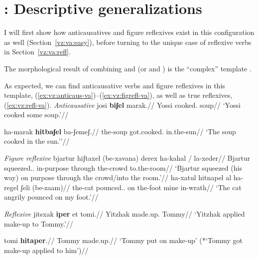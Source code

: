 \section{\thit: Descriptive generalizations} \label{vz:thit}
I will first show how anticausatives and figure reflexives exist in this configuration as well (Section~\ref{vz:va:easy}), before turning to the unique case of reflexive verbs in Section~\ref{vz:va:refl}.


The morphological result of combining {\vz} and {\va} (or {\pz} and {\va}) is the ``complex'' template {\thit}.

As expected, we can find anticausative verbs and figure reflexives in this template, (\ref{ex:vz:anticaus-va})--(\ref{ex:vz:figrefl-va}), as well as true reflexives, (\ref{ex:vz:refl-va}).
\pex\label{ex:vz:anticaus-va}\textit{Anticausative}
	\a \begingl
		\gla josi \textbf{biʃel} marak.//
		\glb Yossi cooked. soup//
		\glft `Yossi cooked some soup.'//
	\endgl
	
	\a \begingl
		\gla ha-marak \textbf{hitbaʃel} ba-ʃemeʃ.//
		\glb the-soup got.cooked. in.the-sun//
		\glft `The soup cooked in the sun.''//
	\endgl
\xe

\pex\label{ex:vz:figrefl-va}\textit{Figure reflexive}
	\a \begingl
		\gla bjartur hiʃtaxel (be-xavana) derex ha-kahal / la-xeder//
		\glb Bjartur squeezed.. in-purpose through the-crowd {} to.the-room//
		\glft `Bjartur squeezed (his way) on purpose through the crowd/into the room.'//
		\endgl
	\a \begingl
		\gla ha-xatul hitnapel al ha-regel ʃeli (be-zaam)//
		\glb the-cat pounced.. on the-foot mine in-wrath//
		\glft `The cat angrily pounced on my foot.'//
		\endgl
\xe

\pex\label{ex:vz:refl-va}\textit{Reflexive}
	\a \begingl
		\gla jitsxak \textbf{iper} et tomi.//
		\glb Yitzhak made.up.  Tommy//
		\glft `Yitzhak applied make-up to Tommy.'//
	\endgl
	
	\a \begingl
		\gla tomi \textbf{hitaper}.//
		\glb Tommy made.up.//
		\glft `Tommy put on make-up' (*`Tommy got make-up applied to him')//
	\endgl
\xe

%	

